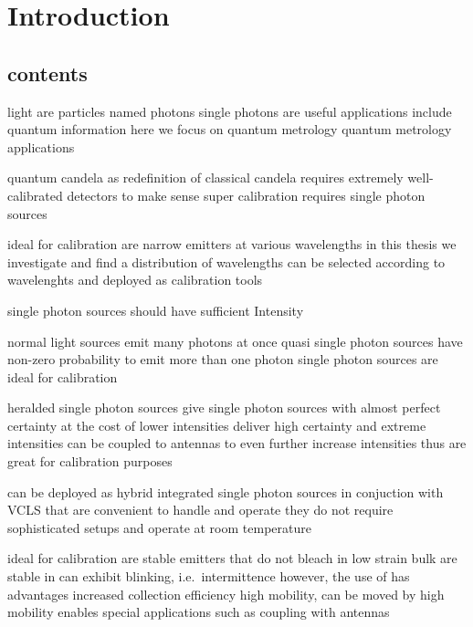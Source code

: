 

\chapter{Introduction}	\label{ch::introduction}

	\section{contents}

		light are particles named photons
		single photons are useful
		applications include quantum information
		here we focus on quantum metrology
		quantum metrology applications

			quantum candela as redefinition of classical candela
			requires extremely well-calibrated detectors to make sense
			super calibration requires single photon sources

			ideal for calibration are narrow \lw emitters at various wavelengths
				in this thesis we investigate \sivs and find a distribution of wavelengths
				\sivs can be selected according to wavelenghts and deployed as calibration tools

				single photon sources should have sufficient Intensity


			normal light sources emit many photons at once
			quasi single photon sources have non-zero probability to emit more than one photon
			single photon sources are ideal for calibration

			heralded single photon sources give single photon sources with almost perfect certainty at the cost of lower intensities \cite{Bock2016}
			\sivs deliver high certainty and extreme intensities
			\sivs can be coupled to antennas to even further increase intensities
			thus \sivs are great for calibration purposes

			\sivs can be deployed as hybrid integrated single photon sources in conjuction with VCLS that are convenient to handle and operate
				they do not require sophisticated setups and operate at room temperature

			ideal for calibration are stable emitters that do not bleach
				\sivs in low strain bulk are stable
				\sivs in \nds can exhibit blinking, i.e.\ \fl intermittence
				however, the use of \nds has advantages
				 	increased collection efficiency
					high mobility, \nds can be moved by \pp
					high mobility enables special applications such as coupling with antennas

